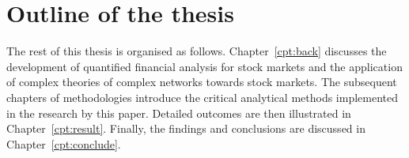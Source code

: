 \section{Outline of the thesis}
The rest of this thesis is organised as follows. Chapter~\ref{cpt:back} discusses the development of quantified financial analysis for stock markets and the application of complex theories of complex networks towards stock markets. The subsequent chapters of methodologies introduce the critical analytical methods implemented in the research by this paper. Detailed outcomes are then illustrated in Chapter~\ref{cpt:result}. Finally, the findings and conclusions are discussed in Chapter~\ref{cpt:conclude}.
